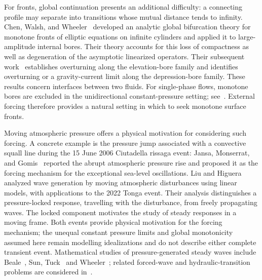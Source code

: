 \documentclass[12pt,letterpaper]{amsart}
\numberwithin{equation}{section}
\begin{document}
{For fronts, global continuation presents an additional difficulty:} a connecting profile may separate into transitions whose mutual distance tends to infinity. Chen, Walsh, and Wheeler~\cite{cwwparis,ChenWalshWheelerFronts} developed an analytic global bifurcation theory for monotone fronts of elliptic equations on infinite cylinders and applied it to large-amplitude internal bores. Their theory accounts for this loss of compactness as well as degeneration of the asymptotic linearized operators. Their subsequent work~\cite{chenvonkarman} establishes overturning along the elevation-bore family and identifies overturning or a gravity-current limit along the depression-bore family. These results concern interfaces between two fluids. {For single-phase flows, monotone bores are excluded} in the unidirectional constant-pressure setting; see~\cite{ChenWalshWheeler2018}. External forcing therefore provides a natural setting in which to seek monotone surface fronts.

Moving atmospheric pressure offers a physical motivation for considering such forcing. A concrete example is the pressure jump associated with a convective squall line during the 15 June 2006 Ciutadella rissaga event: Jansa, Monserrat, and Gomis~\cite{JansaMonserratGomis2007} reported the abrupt atmospheric pressure rise and proposed it as the forcing mechanism for the exceptional sea-level oscillations. Liu and Higuera~\cite{liujfm} analyzed wave generation by moving atmospheric disturbances using linear models, with applications to the 2022 Tonga event. Their analysis distinguishes a pressure-locked response, travelling with the disturbance, from freely propagating waves. The locked component motivates the study of steady responses in a moving frame. Both events provide physical motivation for the forcing mechanism; the unequal constant pressure limits and global monotonicity assumed here remain modelling idealizations and do not describe either complete transient event. Mathematical studies of pressure-generated steady waves include Beale~\cite{Beale1980}, Sun\cite{Sun1993}, Tuck~\cite{VandenBroeckTuck1985} and Wheeler~\cite{warma}; related forced-wave and hydraulic-transition problems are considered in~\cite{chaos,Grue2025,kejfm}.
\end{document}

